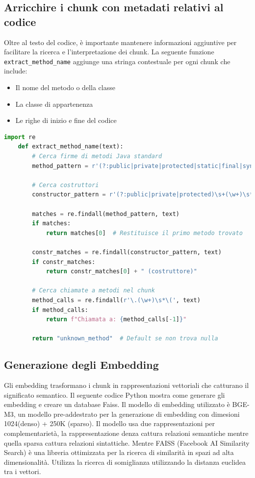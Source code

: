 \documentclass[12pt,a4paper,openright,twoside]{book}
\begin{document}
\subsection{Arricchire i chunk con metadati relativi al codice}
    Oltre al testo del codice, è importante mantenere informazioni aggiuntive per facilitare la ricerca e l'interpretazione dei chunk.
    La seguente funzione \texttt{extract\_method\_name} aggiunge una stringa contestuale per ogni chunk che include:
    \begin{itemize}
        \item Il nome del metodo o della classe
        \item La classe di appartenenza
        \item Le righe di inizio e fine del codice
    \end{itemize}

    \begin{lstlisting}[language=Python, caption={Funzione extract\_method\_name}]
    import re
    def extract_method_name(text):
        # Cerca firme di metodi Java standard
        method_pattern = r'(?:public|private|protected|static|final|synchronized|abstract|native)\s+[\w<>\[\]]+\s+(\w+)\s*\([^)]*\)'
        
        # Cerca costruttori
        constructor_pattern = r'(?:public|private|protected)\s+(\w+)\s*\([^)]*\)'
        
        matches = re.findall(method_pattern, text)
        if matches:
            return matches[0]  # Restituisce il primo metodo trovato
        
        constr_matches = re.findall(constructor_pattern, text)
        if constr_matches:
            return constr_matches[0] + " (costruttore)"
        
        # Cerca chiamate a metodi nel chunk
        method_calls = re.findall(r'\.(\w+)\s*\(', text)
        if method_calls:
            return f"Chiamata a: {method_calls[-1]}"
        
        return "unknown_method"  # Default se non trova nulla
    \end{lstlisting}
        
\subsection{Generazione degli Embedding}
    Gli embedding trasformano i chunk in rappresentazioni vettoriali che catturano il significato semantico.
    Il seguente codice Python mostra come generare gli embedding e creare un database Faiss.
    Il modello di embedding utilizzato è BGE-M3, un modello pre-addestrato per la generazione di embedding con dimesioni 1024(denso) + 250K (sparso).
    Il modello usa due rappresentazioni per complementarietà, la rappresentazione denza cattura relazioni semantiche mentre quella sparsa cattura relazioni sintattiche.
    Mentre FAISS \cite{faiss} (Facebook AI Similarity Search) è una libreria ottimizzata per la ricerca di similarità in spazi ad alta dimensionalità.
    Utilizza la ricerca di somiglianza utilizzando la distanza euclidea tra i vettori.
    
\end{document}

